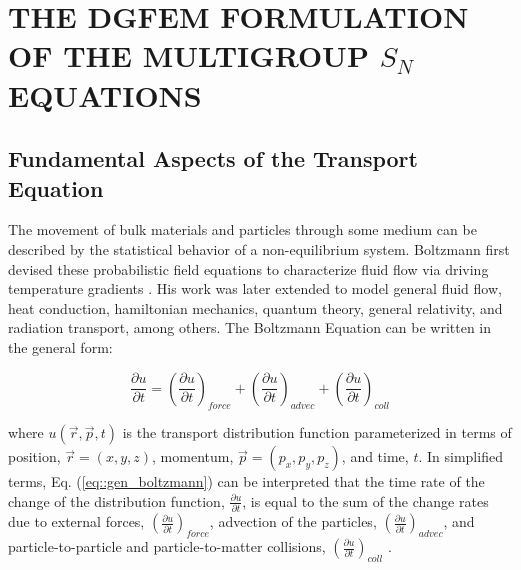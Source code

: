 %
%
%
\chapter{\uppercase {The DGFEM Formulation of the Multigroup $S_N$ Equations}}
\label{sec::Sn}

\section{Fundamental Aspects of the Transport Equation}
\label{sec::DSA_aspects}

The movement of bulk materials and particles through some medium can be described by the statistical behavior of a non-equilibrium system. Boltzmann first devised these probabilistic field equations to characterize fluid flow via driving temperature gradients \cite{encyc_physics}. His work was later extended to model general fluid flow, heat conduction, hamiltonian mechanics, quantum theory, general relativity, and radiation transport, among others. The Boltzmann Equation can be written in the general form:

\begin{equation}
\label{eq::gen_boltzmann}
\frac{\partial u}{\partial t} = \left( \frac{\partial u}{\partial t}  \right)_{force} + \left( \frac{\partial u}{\partial t}  \right)_{advec} + \left( \frac{\partial u}{\partial t}  \right)_{coll}
\end{equation}

\noindent where $u(\vec{r},\vec{p},t)$ is the transport distribution function parameterized in terms of position, $\vec{r}=(x,y,z)$, momentum, $\vec{p}=(p_x,p_y,p_z)$, and time, $t$. In simplified terms, Eq. (\ref{eq::gen_boltzmann}) can be interpreted that the time rate of the change of the distribution function, $\frac{\partial u}{\partial t}$, is equal to the sum of the change rates due to external forces, $\left( \frac{\partial u}{\partial t}  \right)_{force} $, advection of the particles, $\left( \frac{\partial u}{\partial t}  \right)_{advec}$, and particle-to-particle and particle-to-matter collisions, $\left( \frac{\partial u}{\partial t}  \right)_{coll}$ \cite{mcgraw_physics}. 

